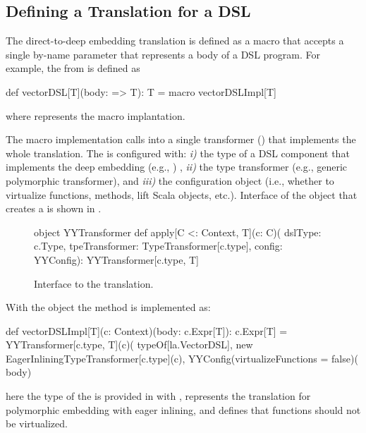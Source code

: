 \subsection{Defining a Translation for a DSL}
\label{sec:defining-a-translation}

The direct-to-deep embedding translation is defined as a macro that accepts a single by-name parameter that represents
a body of a DSL program. For example, the  from  is defined as\begin{lstparagraph}
def vectorDSL[T](body: => T): T = macro vectorDSLImpl[T]
\end{lstparagraph}

where  represents the macro implantation.

The macro implementation calls into a single transformer () that
implements the whole translation. The  is configured with: \emph{i)} the type of
a DSL component that implements the deep embedding (e.g., )
, \emph{ii)} the type transformer (e.g., generic polymorphic transformer), and
\emph{iii)} the configuration object (i.e., whether to virtualize functions, methods, lift Scala objects, etc.).
Interface of the object that creates a  is shown in .
\begin{figure}
\begin{lstparagraph}
object YYTransformer {
  def apply[C <: Context, T](c: C)(
    dslType: c.Type,
    tpeTransformer: TypeTransformer[c.type],
    config: YYConfig): YYTransformer[c.type, T]
}
\end{lstparagraph}
\caption{Interface to the \yy translation.}
\label{fig:YYTransformer}
\end{figure}

With the  object the method  is implemented as:\begin{lstparagraph}
  def vectorDSLImpl[T](c: Context)(body: c.Expr[T]): c.Expr[T] =
    YYTransformer[c.type, T](c)(
      typeOf[la.VectorDSL],
      new EagerInliningTypeTransformer[c.type](c),
      YYConfig(virtualizeFunctions = false)(
      body)
\end{lstparagraph}

here the type of the  is provided in with ,  represents the
translation for polymorphic embedding with eager inlining, and  defines that
functions should not be virtualized.

